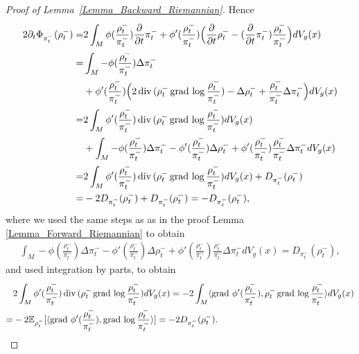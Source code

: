 \begin{proof}[Proof of Lemma~\ref{Lemma_Backward_Riemannian}]
    Hence 
    \begin{align*}
            2 \partial_{t} \Phi_{\pi_{t}^{-}}(\rho_{t}^{-})
            =& 2 \int_{M} \phi(\frac{\rho_{t}^{-}}{\pi_{t}^{-}})\frac{\partial}{\partial t} \pi_{t}^{-} 
            + \phi'(\frac{\rho_{t}^{-}}{\pi_{t}^{-}}) 
            \Big( \frac{\partial }{\partial t} \rho_{t}^{-} - (\frac{\partial}{\partial t} \pi_{t}^{-}) \frac{\rho_{t}^{-}}{\pi_{t}^{-}} \Big) dV_{g}(x)\\
            =& \int_{M} - \phi(\frac{\rho_{t}^{-}}{\pi_{t}^{-}}) \Delta \pi_{t}^{-} \\
            &+ \phi'(\frac{\rho_{t}^{-}}{\pi_{t}^{-}}) 
            \Big( 2\operatorname{div\,} (\rho_{t}^{-} \operatorname{grad\,} \log \frac{\rho_{t}^{-}}{\pi_{t}^{-}} ) - \Delta \rho_{t}^{-} + \frac{\rho_{t}^{-}}{\pi_{t}^{-}} \Delta \pi_{t}^{-} \Big) dV_{g}(x)\\
            =& 2\int_{M} \phi'(\frac{\rho_{t}^{-}}{\pi_{t}^{-}}) 
            \operatorname{div\,} (\rho_{t}^{-} \operatorname{grad\,} \log \frac{\rho_{t}^{-}}{\pi_{t}^{-}} ) dV_{g}(x)\\
            &+ \int_{M} - \phi(\frac{\rho_{t}^{-}}{\pi_{t}^{-}}) \Delta \pi_{t}^{-} 
             - \phi'(\frac{\rho_{t}^{-}}{\pi_{t}^{-}}) \Delta \rho_{t}^{-} + \phi'(\frac{\rho_{t}^{-}}{\pi_{t}^{-}})  \frac{\rho_{t}^{-}}{\pi_{t}^{-}} \Delta \pi_{t}^{-} dV_{g}(x)\\
            =& 2\int_{M} \phi'(\frac{\rho_{t}^{-}}{\pi_{t}^{-}}) 
            \operatorname{div\,} (\rho_{t}^{-} \operatorname{grad\,} \log \frac{\rho_{t}^{-}}{\pi_{t}^{-}} )dV_{g}(x)
            + D_{\pi_{t}^{-}} (\rho_{t}^{-}) \\
            =& - 2 D_{\pi_{t}^{-}} (\rho_{t}^{-}) + D_{\pi_{t}^{-}} (\rho_{t}^{-}) = - D_{\pi_{t}^{-}} (\rho_{t}^{-}),
    \end{align*}
where we used the same steps as as in the proof Lemma \ref{Lemma_Forward_Riemannian} to obtain 
    \begin{align*}
        \int_{M} - \phi(\frac{\rho_{t}^{-}}{\pi_{t}^{-}}) \Delta \pi_{t}^{-} 
        - \phi'(\frac{\rho_{t}^{-}}{\pi_{t}^{-}}) \Delta \rho_{t}^{-} + \phi'(\frac{\rho_{t}^{-}}{\pi_{t}^{-}})  \frac{\rho_{t}^{-}}{\pi_{t}^{-}} \Delta \pi_{t}^{-} dV_{g}(x)
        = D_{\pi_{t}^{-}} (\rho_{t}^{-}),
    \end{align*}
    and used integration by parts, to obtain 
    \begin{align*}
            &2\int_{M} \phi'(\frac{\rho_{t}^{-}}{\pi_{t}^{-}}) 
            \operatorname{div\,} (\rho_{t}^{-} \operatorname{grad\,} \log \frac{\rho_{t}^{-}}{\pi_{t}^{-}} ) dV_{g}(x) 
            = - 2 \int_{M} \langle \operatorname{grad\,} \phi'(\frac{\rho_{t}^{-}}{\pi_{t}^{-}}) , \rho_{t}^{-} \operatorname{grad\,} \log \frac{\rho_{t}^{-}}{\pi_{t}^{-}}\rangle dV_{g}(x) \\
            =& - 2 \mathbb{E}_{\rho_{t}^{-} } [\langle \operatorname{grad\,} \phi'(\frac{\rho_{t}^{-}}{\pi_{t}^{-}}) , \operatorname{grad\,} \log \frac{\rho_{t}^{-}}{\pi_{t}^{-}}\rangle ] 
            = - 2 D_{\pi_{t}^{-}} (\rho_{t}^{-}).
    \end{align*}
\end{proof}

